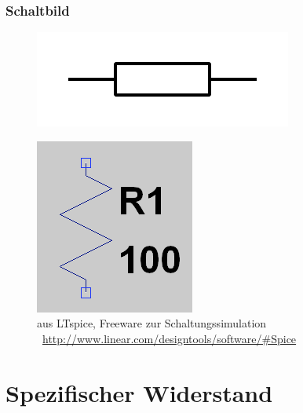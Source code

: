 \begin{frame}
  \frametitle{Schaltbild}

  \begin{center}
    \begin{figure}
      \includegraphics[width=.3\textwidth,height=.3\textheight,keepaspectratio]{e04/Resistor_symbol_IEC.png}
    \end{figure}
  \end{center}

  \begin{center}
    \begin{figure}
      \includegraphics[width=.4\textwidth,height=.4\textheight,keepaspectratio]{e04/R_LTspice.png}
      \caption{aus LTspice, Freeware zur Schaltungssimulation \ExternalLink~\url{http://www.linear.com/designtools/software/\#Spice}}
    \end{figure}
  \end{center}

\end{frame}


\section*{Spezifischer Widerstand}

